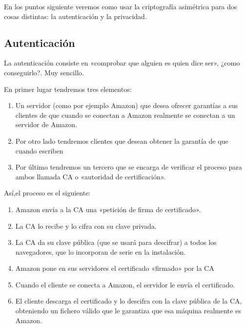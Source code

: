 \documentclass[letterpaper,10pt,spanish]{sphinxmanual}
\begin{document}
En los puntos siguiente veremos como usar la criptografía asimétrica para dos cosas distintas: la autenticación y la privacidad.


\subsection{Autenticación}
\label{\detokenize{tema_pautas_seguridad_informatica/tema_pautas_seguridad_informatica:autenticacion}}
La autenticación consiste en «comprobar que alguien es quien dice ser», ¿como conseguirlo?. Muy sencillo.

En primer lugar tendremos tres elementos:
\begin{enumerate}
\def\theenumi{\arabic{enumi}}
\def\labelenumi{\theenumi .}
\makeatletter\def\p@enumii{\p@enumi \theenumi .}\makeatother
\item {} 
Un servidor (como por ejemplo Amazon) que desea ofrecer garantías a sus clientes de que cuando se conectan a Amazon realmente se conectan a un servidor de Amazon.

\item {} 
Por otro lado tendremos clientes que desean obtener la garantía de que cuando escriben  

\item {} 
Por último tendremos un tercero que se encarga de verificar el proceso para ambos llamada CA o «autoridad de certificación».

\end{enumerate}

Así,el proceso es el siguiente:
\begin{enumerate}
\def\theenumi{\arabic{enumi}}
\def\labelenumi{\theenumi .}
\makeatletter\def\p@enumii{\p@enumi \theenumi .}\makeatother
\item {} 
Amazon envía a la CA una «petición de firma de certificado».

\item {} 
La CA lo recibe y lo cifra con su clave privada.

\item {} 
La CA da su clave pública (que se usará para descifrar) a todos los navegadores, que lo incorporan de serie en la instalación.

\item {} 
Amazon pone en sus servidores el certificado «firmado» por la CA

\item {} 
Cuando el cliente se conecta a Amazon, el servidor le envía el certificado.

\item {} 
El cliente descarga el certificado y lo descifra con la clave pública de la CA, obteniendo un fichero válido que le garantiza que esa máquina realmente es Amazon.

\end{enumerate}
\end{document}
